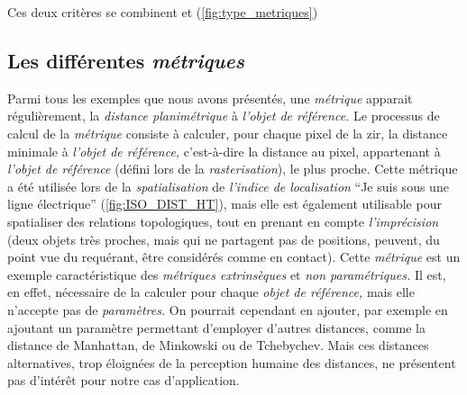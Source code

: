 Ces deux critères se combinent et (\autoref{fig:type_metriques})

\subsection{Les différentes \emph{métriques}}

Parmi tous les exemples que nous avons présentés, une \emph{métrique}
apparait régulièrement, la \emph{distance planimétrique} à
\emph{l'objet de référence.} Le processus de calcul de la
\emph{métrique} consiste à calculer, pour chaque pixel de la \ac{zir},
la distance minimale à \emph{l'objet de référence,} c'est-à-dire la
distance au pixel, appartenant à \emph{l'objet de référence} (défini
lors de la \emph{rasterisation}), le plus proche. Cette métrique a été
utilisée lors de la \emph{spatialisation} de \emph{l'indice de
  localisation} \enquote{Je suis sous une ligne électrique}
(\autoref{fig:ISO_DIST_HT}), mais elle est également utilisable pour
spatialiser des relations topologiques, tout en prenant en compte
\emph{l'imprécision} (\eg deux objets très proches, mais qui ne
partagent pas de positions, peuvent, du point vue du requérant, être
considérés comme en contact). Cette \emph{métrique} est un exemple
caractéristique des \emph{métriques extrinsèques} et \emph{non
  paramétriques.} Il est, en effet, nécessaire de la calculer pour
chaque \emph{objet de référence,} mais elle n'accepte pas de
\emph{paramètres.}  On pourrait cependant en ajouter, par exemple en
ajoutant un paramètre permettant d'employer d'autres distances, comme
la distance de Manhattan, de Minkowski ou de Tchebychev. Mais ces
distances alternatives, trop éloignées de la perception humaine des
distances, ne présentent pas d’intérêt pour notre cas d'application.

